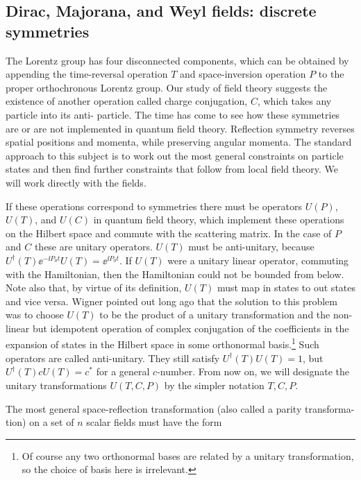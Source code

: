 \subsection{Dirac, Majorana, and Weyl fields: discrete symmetries}

The Lorentz group has four disconnected components, which can be obtained by
appending the time-reversal operation $T$ and space-inversion operation $P$ to the proper
orthochronous Lorentz group. Our study of field theory suggests the existence of
another operation called charge conjugation, $C$, which takes any particle into its anti-
particle. The time has come to see how these symmetries are or are not implemented
in quantum field theory. Reflection symmetry reverses spatial positions and momenta,
while preserving angular momenta. The standard approach to this subject is to work
out the most general constraints on particle states and then find further constraints
that follow from local field theory. We will work directly with the fields.

If these operations correspond to symmetries there must be operators $U(P)$, $U(T)$,
and $U(C)$ in quantum field theory, which implement these operations on the Hilbert
space and commute with the scattering matrix. In the case of $P$ and $C$ these are unitary
operators. $U(T)$ must be anti-unitary, because $U^\dagger(T)\ee^{-\ii P_0t}U(T)=\ee^{\ii P_0t}$. If $U(T)$
were a unitary linear operator, commuting with the Hamiltonian, then the Hamiltonian
could not be bounded from below. Note also that, by virtue of its definition, $U(T)$ must
map in states to out states and vice versa. Wigner pointed out long ago that the solution
to this problem was to choose $U(T)$ to be the product of a unitary transformation and
the non-linear but idempotent operation of complex conjugation of the coefficients in
the expansion of states in the Hilbert space in some orthonormal basis.\footnote[8]{Of course any two orthonormal bases are related by a unitary transformation, so the choice of basis here is irrelevant.}
Such operators are called anti-unitary. They still satisfy $U^\dagger(T)U(T)=1$, but $U^\dagger(T)cU(T)=c^*$
for a general $c$-number. From now on, we will designate the unitary transformations
$U(T,C,P)$ by the simpler notation $T,C,P$.

The most general space-reflection transformation (also called a parity transforma-
tion) on a set of $n$ scalar fields must have the form

